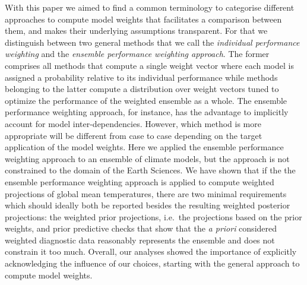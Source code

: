 \conclusions  \label{sec:conclusion}%

With this paper we aimed to find a common terminology to categorise different approaches to compute model weights that facilitates a comparison between them, and makes their underlying assumptions transparent. For that we distinguish between two general methods that we call the \emph{individual performance weighting} and the \emph{ensemble performance weighting approach}. The former comprises all methods that compute a single weight vector where each model is assigned a probability relative to its individual performance while methods belonging to the latter compute a distribution over weight vectors tuned to optimize the performance of the weighted ensemble as a whole. 
The ensemble performance weighting approach, for instance, has the advantage to implicitly account for model inter-dependencies. However, which method is more appropriate will be different from case to case depending on the target application of the model weights.
Here we applied the ensemble performance weighting approach to an ensemble of climate models, but the approach is not constrained to the domain of the Earth Sciences.
We have shown that if the the ensemble performance weighting approach is applied to compute weighted projections of global mean temperatures, there are two minimal requirements which should ideally both be reported besides the resulting weighted posterior projections: the weighted prior projections, i.e.~the projections based on the prior weights, and prior predictive checks that show that the \emph{a priori} considered weighted diagnostic data reasonably represents the ensemble and does not constrain it too much. Overall, our analyses showed the importance of explicitly acknowledging the influence of our choices, starting with the general approach to compute model weights.

